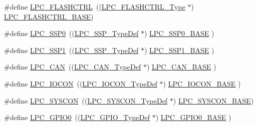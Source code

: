\begin{DoxyCompactItemize}
\item 
\#define \hyperlink{group___l_p_c11xx___definitions_ga0e5b0ed0e4ad1155df98372c932e8bc7}{L\+P\+C\+\_\+\+F\+L\+A\+S\+H\+C\+T\+RL}~((\hyperlink{struct_l_p_c___f_l_a_s_h_c_t_r_l___type}{L\+P\+C\+\_\+\+F\+L\+A\+S\+H\+C\+T\+R\+L\+\_\+\+Type} $\ast$) \hyperlink{group___l_p_c11xx___definitions_gad8bd09a830e15ea80293576f61deeccd}{L\+P\+C\+\_\+\+F\+L\+A\+S\+H\+C\+T\+R\+L\+\_\+\+B\+A\+SE})
\item 
\#define \hyperlink{group___l_p_c11xx___definitions_gac213e0325a8e8a972bd2e0dd6ccf353c}{L\+P\+C\+\_\+\+S\+S\+P0}~((\hyperlink{struct_l_p_c___s_s_p___type_def}{L\+P\+C\+\_\+\+S\+S\+P\+\_\+\+Type\+Def}    $\ast$) \hyperlink{group___l_p_c11xx___definitions_ga53fb1af80b541545988f2a966681abfd}{L\+P\+C\+\_\+\+S\+S\+P0\+\_\+\+B\+A\+SE}  )
\item 
\#define \hyperlink{group___l_p_c11xx___definitions_ga09c4610ada1d9aa18913963cbd1a6e52}{L\+P\+C\+\_\+\+S\+S\+P1}~((\hyperlink{struct_l_p_c___s_s_p___type_def}{L\+P\+C\+\_\+\+S\+S\+P\+\_\+\+Type\+Def}    $\ast$) \hyperlink{group___l_p_c11xx___definitions_ga05d118997f53f596d3a087f8b91a1969}{L\+P\+C\+\_\+\+S\+S\+P1\+\_\+\+B\+A\+SE}  )
\item 
\#define \hyperlink{group___l_p_c11xx___definitions_ga177aa5b075c24ed459e92f4698bea9cc}{L\+P\+C\+\_\+\+C\+AN}~((\hyperlink{struct_l_p_c___c_a_n___type_def}{L\+P\+C\+\_\+\+C\+A\+N\+\_\+\+Type\+Def}    $\ast$) \hyperlink{group___l_p_c11xx___definitions_gaeae0f80f43f37b41a8a1c3cb7028d22f}{L\+P\+C\+\_\+\+C\+A\+N\+\_\+\+B\+A\+SE}   )
\item 
\#define \hyperlink{group___l_p_c11xx___definitions_gaabc651799ba17b0dd4a0114c8d48a145}{L\+P\+C\+\_\+\+I\+O\+C\+ON}~((\hyperlink{struct_l_p_c___i_o_c_o_n___type_def}{L\+P\+C\+\_\+\+I\+O\+C\+O\+N\+\_\+\+Type\+Def}  $\ast$) \hyperlink{group___l_p_c11xx___definitions_gae48aea115d5924805263d7a15402d4fa}{L\+P\+C\+\_\+\+I\+O\+C\+O\+N\+\_\+\+B\+A\+SE} )
\item 
\#define \hyperlink{group___l_p_c11xx___definitions_gabe45c10a979fe812e3d9ecd72fe33a2f}{L\+P\+C\+\_\+\+S\+Y\+S\+C\+ON}~((\hyperlink{struct_l_p_c___s_y_s_c_o_n___type_def}{L\+P\+C\+\_\+\+S\+Y\+S\+C\+O\+N\+\_\+\+Type\+Def} $\ast$) \hyperlink{group___l_p_c11xx___definitions_ga976cd83a81fd89a472221e68f0c0fbff}{L\+P\+C\+\_\+\+S\+Y\+S\+C\+O\+N\+\_\+\+B\+A\+SE})
\item 
\#define \hyperlink{group___l_p_c11xx___definitions_ga92f3de6ff5cfd5b8c290696fad07b18a}{L\+P\+C\+\_\+\+G\+P\+I\+O0}~((\hyperlink{struct_l_p_c___g_p_i_o___type_def}{L\+P\+C\+\_\+\+G\+P\+I\+O\+\_\+\+Type\+Def}   $\ast$) \hyperlink{group___l_p_c11xx___definitions_ga09e0e964ea1abf3b991772df2aa52405}{L\+P\+C\+\_\+\+G\+P\+I\+O0\+\_\+\+B\+A\+SE} )

\end{DoxyCompactItemize}

